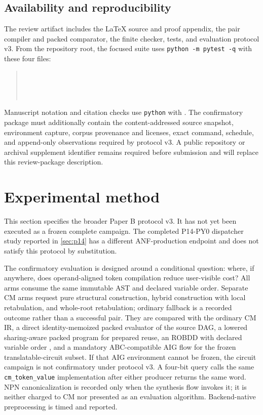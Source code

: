 \documentclass[11pt]{article}
\begin{document}
\subsection{Availability and reproducibility}

The review artifact includes the LaTeX source and proof appendix, the pair
compiler and packed comparator, the finite checker, tests, and evaluation
protocol v3. From the repository root, the focused suite uses
\texttt{python -m pytest -q} with these four files:
\begin{quote}\small
  \\
  \\
  \\
\end{quote}
Manuscript notation and citation checks use \texttt{python} with
. The
confirmatory package must additionally contain the content-addressed source
snapshot, environment capture, corpus provenance and licenses, exact command,
schedule, and append-only observations required by protocol v3. A public
repository or archival supplement identifier remains required before
submission and will replace this review-package description.

\relatedworksection
\logicalmatrixsection

\section{Experimental method}
\label{sec:experiments}

This section specifies the broader Paper B protocol v3. It has not yet been
executed as a frozen complete campaign. The completed P14-PY0 dispatcher
study reported in \cref{sec:p14} has a different ANF-production endpoint and
does not satisfy this protocol by substitution.


The confirmatory evaluation is designed around a conditional question: where,
if anywhere, does operand-aligned token compilation reduce user-visible cost?
All arms consume the same immutable AST and declared variable order. Separate
CM arms request pure structural construction, hybrid construction with local
retabulation, and whole-root retabulation; ordinary fallback is a recorded
outcome rather than a successful pair. They are compared with the ordinary CM
IR, a direct identity-memoized packed evaluator of the source DAG, a lowered
sharing-aware packed program for prepared reuse, an ROBDD with declared
variable order \citep{bryant1986}, and a mandatory ABC-compatible AIG flow for
the frozen translatable-circuit subset. If that AIG environment cannot be
frozen, the circuit campaign is not confirmatory under protocol v3. A four-bit
query calls the same \texttt{cm\_token\_value} implementation after either
producer returns the same word. NPN canonicalization is recorded only when the
synthesis flow invokes it; it is neither charged to CM nor presented as an
evaluation algorithm. Backend-native preprocessing is timed and reported.
\end{document}
